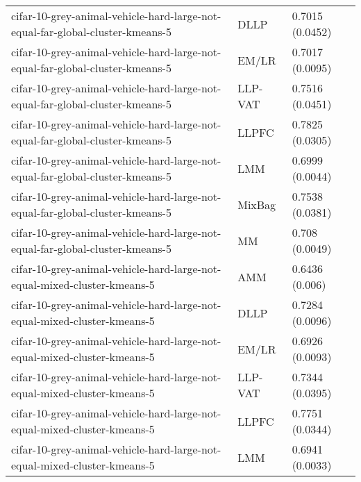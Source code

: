 \begin{longtable}{lll}
                                cifar-10-grey-animal-vehicle-hard-large-not-equal-far-global-cluster-kmeans-5 &      DLLP &                       0.7015 (0.0452) \\
                                cifar-10-grey-animal-vehicle-hard-large-not-equal-far-global-cluster-kmeans-5 &     EM/LR &                       0.7017 (0.0095) \\
                                cifar-10-grey-animal-vehicle-hard-large-not-equal-far-global-cluster-kmeans-5 &   LLP-VAT &                       0.7516 (0.0451) \\
                                cifar-10-grey-animal-vehicle-hard-large-not-equal-far-global-cluster-kmeans-5 &     LLPFC &                       0.7825 (0.0305) \\
                                cifar-10-grey-animal-vehicle-hard-large-not-equal-far-global-cluster-kmeans-5 &       LMM &                       0.6999 (0.0044) \\
                                cifar-10-grey-animal-vehicle-hard-large-not-equal-far-global-cluster-kmeans-5 &    MixBag &                       0.7538 (0.0381) \\
                                cifar-10-grey-animal-vehicle-hard-large-not-equal-far-global-cluster-kmeans-5 &        MM &                        0.708 (0.0049) \\
                                     cifar-10-grey-animal-vehicle-hard-large-not-equal-mixed-cluster-kmeans-5 &       AMM &                        0.6436 (0.006) \\
                                     cifar-10-grey-animal-vehicle-hard-large-not-equal-mixed-cluster-kmeans-5 &      DLLP &                       0.7284 (0.0096) \\
                                     cifar-10-grey-animal-vehicle-hard-large-not-equal-mixed-cluster-kmeans-5 &     EM/LR &                       0.6926 (0.0093) \\
                                     cifar-10-grey-animal-vehicle-hard-large-not-equal-mixed-cluster-kmeans-5 &   LLP-VAT &                       0.7344 (0.0395) \\
                                     cifar-10-grey-animal-vehicle-hard-large-not-equal-mixed-cluster-kmeans-5 &     LLPFC &                       0.7751 (0.0344) \\
                                     cifar-10-grey-animal-vehicle-hard-large-not-equal-mixed-cluster-kmeans-5 &       LMM &                       0.6941 (0.0033) \\

\end{longtable}
